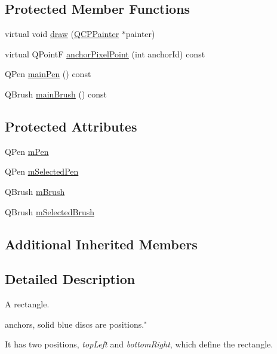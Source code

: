 \subsection*{Protected Member Functions}
\begin{DoxyCompactItemize}
\item 
virtual void \hyperlink{class_q_c_p_item_rect_a18cd583638b876cdd50f1a155ec182aa}{draw} (\hyperlink{class_q_c_p_painter}{Q\+C\+P\+Painter} $\ast$painter)
\item 
virtual Q\+Point\+F \hyperlink{class_q_c_p_item_rect_ae0973f8281fb52361b0c99ee899be07e}{anchor\+Pixel\+Point} (int anchor\+Id) const 
\item 
Q\+Pen \hyperlink{class_q_c_p_item_rect_afa0fb7c6328a1e197ecd537de36daf8f}{main\+Pen} () const 
\item 
Q\+Brush \hyperlink{class_q_c_p_item_rect_ab0bd8e272e822ec851ba5b0c20e9200e}{main\+Brush} () const 
\end{DoxyCompactItemize}
\subsection*{Protected Attributes}
\begin{DoxyCompactItemize}
\item 
Q\+Pen \hyperlink{class_q_c_p_item_rect_aa0d49323628d6752026056bfb52afd86}{m\+Pen}
\item 
Q\+Pen \hyperlink{class_q_c_p_item_rect_a73cc0bee61de3c67221ec8c7a76a29ed}{m\+Selected\+Pen}
\item 
Q\+Brush \hyperlink{class_q_c_p_item_rect_a2d7f207fada27588b3a52b19234d3c2e}{m\+Brush}
\item 
Q\+Brush \hyperlink{class_q_c_p_item_rect_a21b70eee59b6e19ae0bbdf037b13508f}{m\+Selected\+Brush}
\end{DoxyCompactItemize}
\subsection*{Additional Inherited Members}


\subsection{Detailed Description}
A rectangle. 

 anchors, solid blue discs are positions."

It has two positions, {\itshape top\+Left} and {\itshape bottom\+Right}, which define the rectangle. 

